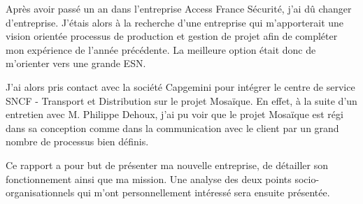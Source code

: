 Après avoir passé un an dans l'entreprise Access France Sécurité, j'ai dû changer d'entreprise. J'étais alors à la recherche d'une entreprise qui m'apporterait une vision orientée processus de production et gestion de projet afin de compléter mon expérience de l'année précédente. La meilleure option était donc de m'orienter vers une grande ESN.

J'ai alors pris contact avec la société Capgemini pour intégrer le centre de service SNCF - Transport et Distribution sur le projet Mosaïque. En effet, à la suite d'un entretien avec M. Philippe Dehoux, j'ai pu voir que le projet Mosaïque est régi dans sa conception comme dans la communication avec le client par un grand nombre de processus bien définis.

Ce rapport a pour but de présenter ma nouvelle entreprise, de détailler son fonctionnement ainsi que ma mission. Une analyse des deux points socio-organisationnels qui m'ont personnellement intéressé sera ensuite présentée.